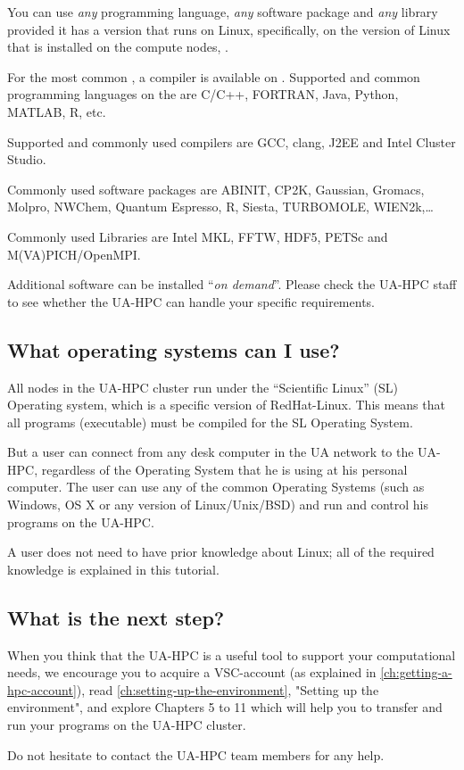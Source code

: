 You can use \emph{any} programming language, \emph{any} software package and
\emph{any} library provided it has a version that runs on Linux, specifically,
on the version of Linux that is installed on the compute nodes, \operatingsystem.

For the most common , a compiler is available on
\operatingsystem. Supported and common programming languages on the \hpc are
C/C++, FORTRAN, Java, Python, MATLAB, R, etc.

Supported and commonly used compilers are GCC, clang, J2EE and Intel Cluster
Studio.

Commonly used software packages are ABINIT, CP2K, Gaussian, Gromacs, Molpro,
NWChem, Quantum Espresso, R, Siesta, TURBOMOLE, WIEN2k,\ldots

Commonly used Libraries are Intel MKL, FFTW, HDF5, PETSc and M(VA)PICH/OpenMPI.

Additional software can be installed ``\emph{on demand}''. Please check the
UA-HPC staff to see whether the UA-HPC can handle your specific requirements.

\subsection{What operating systems can I use?}
\label{sec:what-operating-systems-can-i-use}

All nodes in the UA-HPC cluster run under the ``Scientific Linux'' (SL)
Operating system, which is a specific version of RedHat-Linux. This means that
all programs (executable) must be compiled for the SL Operating System.

But a user can connect from any desk computer in the UA network to the UA-HPC,
regardless of the Operating System that he is using at his personal computer.
The user can use any of the common Operating Systems (such as Windows, OS X or
any version of Linux/Unix/BSD) and run and control his programs on the UA-HPC.

A user does not need to have prior knowledge about Linux; all of the required
knowledge is explained in this tutorial.

\subsection{What is the next step?}
\label{sec:what-is-the-next-step}

When you think that the UA-HPC is a useful tool to support your computational
needs, we encourage you to acquire a VSC-account (as explained in
\autoref{ch:getting-a-hpc-account}), read \autoref{ch:setting-up-the-environment}, "Setting up the
environment", and explore Chapters 5 to 11 which will help you to transfer and
run your programs on the UA-HPC cluster.

Do not hesitate to contact the UA-HPC team members for any help.
